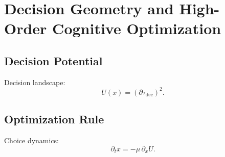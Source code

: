 \chapter{Decision Geometry and High-Order Cognitive Optimization}

\section{Decision Potential}
Decision landscape:
\[
U(x) = (\partial\tau_{\mathrm{dec}})^2.
\]

\section{Optimization Rule}
Choice dynamics:
\[
\partial_t x = -\mu\,\partial_x U.
\]

